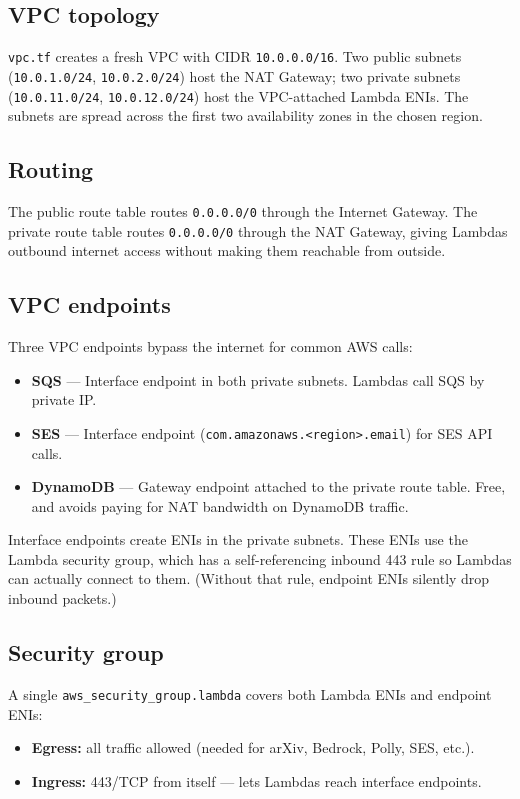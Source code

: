 \documentclass[11pt,a4paper]{article}
\begin{document}
\subsection{VPC topology}
\texttt{vpc.tf} creates a fresh VPC with CIDR \texttt{10.0.0.0/16}. Two public subnets (\texttt{10.0.1.0/24}, \texttt{10.0.2.0/24}) host the NAT Gateway; two private subnets (\texttt{10.0.11.0/24}, \texttt{10.0.12.0/24}) host the VPC-attached Lambda ENIs. The subnets are spread across the first two availability zones in the chosen region.

\subsection{Routing}
The public route table routes \texttt{0.0.0.0/0} through the Internet Gateway. The private route table routes \texttt{0.0.0.0/0} through the NAT Gateway, giving Lambdas outbound internet access without making them reachable from outside.

\subsection{VPC endpoints}
Three VPC endpoints bypass the internet for common AWS calls:
\begin{itemize}[leftmargin=*]
  \item \textbf{SQS} --- Interface endpoint in both private subnets. Lambdas call SQS by private IP.
  \item \textbf{SES} --- Interface endpoint (\texttt{com.amazonaws.<region>.email}) for SES API calls.
  \item \textbf{DynamoDB} --- Gateway endpoint attached to the private route table. Free, and avoids paying for NAT bandwidth on DynamoDB traffic.
\end{itemize}

Interface endpoints create ENIs in the private subnets. These ENIs use the Lambda security group, which has a self-referencing inbound 443 rule so Lambdas can actually connect to them. (Without that rule, endpoint ENIs silently drop inbound packets.)

\subsection{Security group}
A single \texttt{aws\_security\_group.lambda} covers both Lambda ENIs and endpoint ENIs:
\begin{itemize}[leftmargin=*]
  \item \textbf{Egress:} all traffic allowed (needed for arXiv, Bedrock, Polly, SES, etc.).
  \item \textbf{Ingress:} 443/TCP from itself --- lets Lambdas reach interface endpoints.
\end{itemize}
\end{document}
